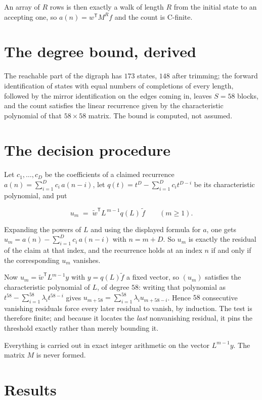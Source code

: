 \documentclass[11pt]{article}
\theoremstyle{definition}
\begin{document}
An array of $R$ rows is then exactly a walk of length $R$ from the initial state to an accepting one, so $a(n) = w^{\mathsf T}M^{R}f$ and the count is C-finite.

\section{The degree bound, derived}

The reachable part of the digraph has $173$ states, $148$ after trimming; the forward identification of states with equal numbers of completions of every length, followed by the mirror identification on the edges coming in, leaves $S = 58$ blocks, and the count satisfies the linear recurrence given by the characteristic polynomial of that $58\times58$ matrix. The bound is computed, not assumed.

\section{The decision procedure}

Let $c_1,\dots,c_D$ be the coefficients of a claimed recurrence $a(n) = \sum_{i=1}^{D} c_i\,a(n-i)$, let $q(t) = t^{D} - \sum_{i=1}^{D} c_i t^{D-i}$ be its characteristic polynomial, and put

\[u_m \;=\; \tilde w^{\mathsf T} L^{\,m-1} q(L)\,\tilde f \qquad (m \ge 1).\]

Expanding the powers of $L$ and using the displayed formula for $a$, one gets $u_m = a(n) - \sum_{i=1}^{D} c_i\,a(n-i)$ with $n = m + D$. So $u_m$ is exactly the residual of the claim at that index, and the recurrence holds at an index $n$ if and only if the corresponding $u_m$ vanishes.

Now $u_m = \tilde w^{\mathsf T} L^{m-1} y$ with $y = q(L)\tilde f$ a fixed vector, so $(u_m)$ satisfies the characteristic polynomial of $L$, of degree $58$: writing that polynomial as $t^{58} - \sum_{i=1}^{58} \lambda_i t^{58-i}$ gives $u_{m+58} = \sum_{i=1}^{58} \lambda_i u_{m+58-i}$. Hence $58$ consecutive vanishing residuals force every later residual to vanish, by induction. The test is therefore finite; and because it locates the {\itshape last} nonvanishing residual, it pins the threshold exactly rather than merely bounding it.

Everything is carried out in exact integer arithmetic on the vector $L^{m-1}y$. The matrix $M$ is never formed.

\section{Results}
\end{document}
